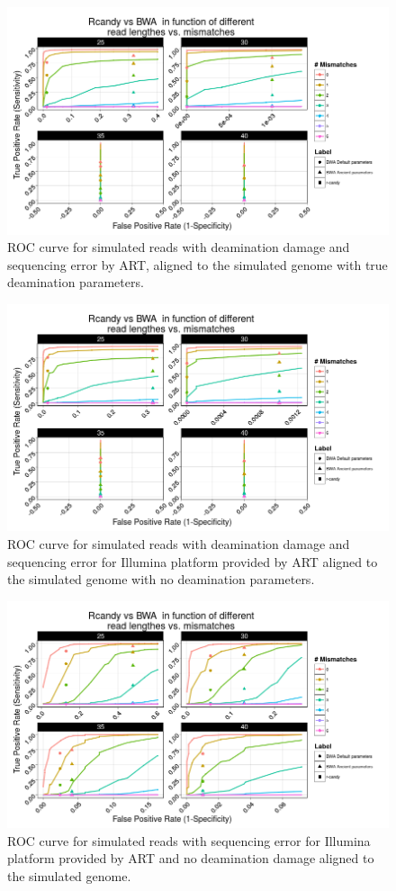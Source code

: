 \documentclass[11pt,a4paper]{report}
\begin{document}
\begin{figure}[H]
\centering
\includegraphics[width=12cm]{pictures/DS1-A.png}
\caption{ROC curve for simulated reads with deamination damage and sequencing error by ART, aligned to the simulated genome
         with true deamination parameters.}
\label{DS1}
\end{figure}


\begin{figure}[H]
\centering
\includegraphics[width=12cm]{pictures/DS2-A.png}
\caption{ROC curve for simulated reads with deamination damage and sequencing error for Illumina platform provided by ART aligned to the simulated genome
         with no deamination parameters.}
\label{DS2}
\end{figure}

\begin{figure}[H]
\centering
\includegraphics[width=12cm]{pictures/DS3-A.png}
\caption{ROC curve for simulated reads with sequencing error for Illumina platform provided by ART and no deamination damage aligned to the simulated genome.}
\label{DS3}
\end{figure}
\end{document}
